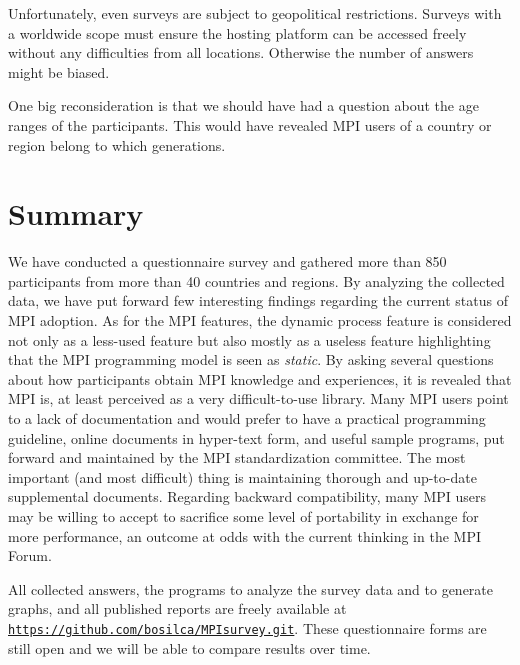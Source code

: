 \documentclass[preprint,5p,times]{elsarticle}
\newcommand{\revision}[2]{{\color{blue}#2}}
\begin{document}
{{\begin{description}[leftmargin=0cm]
\item[Online Forms]
Unfortunately, even surveys are subject to geopolitical restrictions.
Surveys with a worldwide scope must ensure the hosting platform
can be accessed freely
without any difficulties from all locations. Otherwise the number of
answers might be biased.

\item[Age Range]
One big reconsideration is that we should have had a question about the
age ranges of the participants. This would have revealed MPI users
of a country or region belong to which generations.

\end{description}
}

\section{Summary}

We have conducted a questionnaire survey and gathered more than 850
participants from more than 40 countries and regions. By analyzing the collected
data, we have put forward few interesting findings regarding the current status
of MPI adoption. As for the MPI features, the dynamic process feature is
considered not only as a less-used feature but also mostly as a useless feature
highlighting that the MPI programming model is seen as {\em static}. By asking
several questions about how participants obtain MPI knowledge and experiences, it is
revealed that MPI is, at least perceived as a very difficult-to-use library.
 Many MPI users point to a lack of
documentation and would prefer to have a practical programming guideline, online
documents in hyper-text form, and useful sample programs, put forward and
maintained by the MPI standardization committee. The most important (and most
difficult) thing is maintaining thorough and up-to-date supplemental documents.
Regarding backward compatibility, many MPI users may be willing to accept to
sacrifice some level of portability in exchange for more performance, an outcome
at odds with the current thinking in the MPI Forum.

All collected answers, the programs to analyze the survey data and to
generate graphs, and all published reports are freely available at
{\tt \url{https://github.com/bosilca/MPIsurvey.git}}.
\revision{}{These
questionnaire forms are still open and we will be able to compare
results over time.}

}
\end{document}
